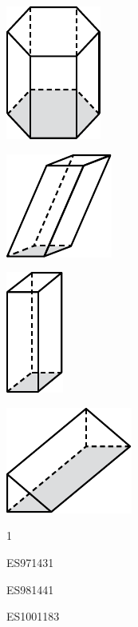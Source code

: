 \documentclass[a4paper,11pt]{report}
\begin{document}
\begin{exop}
{\begin{tasks}
\includegraphics[scale=1]{media/es-21/pq6}
	\task 

\includegraphics[scale=1]{media/es-21/pq7}
	\task 

\includegraphics[scale=1]{media/es-21/pq8}
	\task 

\includegraphics[scale=1]{media/es-21/pq9}
\end{tasks}
}{1}
\end{exop}
\begin{exof}{ES97}{143}{1}
\end{exof}
\begin{exof}{ES98}{144}{1}
\end{exof}
\begin{exol}{ES100}{118}{3}
\end{exol}
\end{document}
